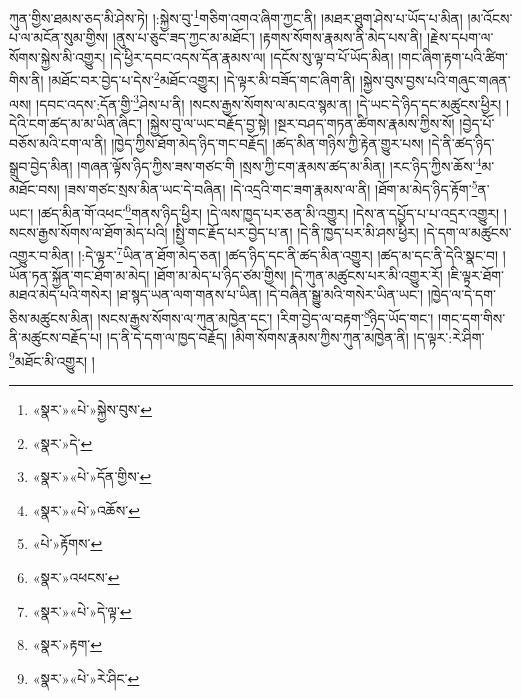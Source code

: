 ཀུན་གྱིས་ཐམས་ཅད་མི་ཤེས་ཏེ། །:སྐྱེས་བུ་\footnote{«སྣར་»«པེ་»སྐྱེས་བུས་}གཅིག་འགའ་ཞིག་ཀྱང་ནི། །མཐར་ཐུག་ཤེས་པ་ཡོད་པ་མིན། །མ་འོངས་པ་ལ་མངོན་སུམ་གྱིས། །ནུས་པ་ཅུང་ཟད་ཀྱང་མ་མཐོང་། །རྟགས་སོགས་རྣམས་ནི་མེད་པས་ནི། །རྗེས་དཔག་ལ་སོགས་སྐྱེས་མི་འགྱུར། །དེ་ཕྱིར་དབང་འདས་དོན་རྣམས་ལ། །དངོས་སུ་ལྟ་བ་པོ་ཡོད་མིན། །གང་ཞིག་རྟག་པའི་ཚིག་གིས་ནི། །མཐོང་བར་བྱེད་པ་དེས་\footnote{«སྣར་»དེ་}མཐོང་འགྱུར། །དེ་ལྟར་མི་བཟོད་གང་ཞིག་ནི། །སྐྱེས་བུས་བྱས་པའི་གཞུང་གཞན་ལས། །དབང་འདས་:དོན་གྱི་\footnote{«སྣར་»«པེ་»དོན་གྱིས་}ཤེས་པ་ནི། །སངས་རྒྱས་སོགས་ལ་མངའ་སྙམ་ན། །དེ་ཡང་དེ་ཉིད་དང་མཚུངས་ཕྱིར། །དེའི་ངག་ཚད་མ་མ་ཡིན་ཞིང་། །སྐྱེས་བུ་ལ་ཡང་བརྗོད་བྱ་སྟེ། །སྔར་བཤད་གཏན་ཚིགས་རྣམས་ཀྱིས་སོ། །བྱེད་པོ་བཅོས་མའི་ངག་ལ་ནི། །ཁྱེད་ཀྱིས་ཐོག་མེད་ཉིད་གང་བརྗོད། །ཚད་མིན་གཉིས་ཀྱི་རྟེན་གྱུར་པས། །དེ་ནི་ཚད་ཉིད་སྒྲུབ་བྱེད་མིན། །གཞན་ལྟོས་ཉིད་ཀྱིས་ཟས་གཙང་གི །སྲས་ཀྱི་ངག་རྣམས་ཚད་མ་མིན། །རང་ཉིད་ཀྱིས་ཆོས་\footnote{«སྣར་»«པེ་»འཆོས་}མ་མཐོང་བས། །ཟས་གཙང་སྲས་མིན་ཡང་དེ་བཞིན། །དེ་འདྲའི་གང་ཟག་རྣམས་ལ་ནི། །ཐོག་མ་མེད་ཉིད་རྟོག་\footnote{«པེ་»རྟོགས་}ན་ཡང་། །ཚད་མིན་གོ་འཕང་\footnote{«སྣར་»འཕངས་}གནས་ཉིད་ཕྱིར། །དེ་ལས་ཁྱད་པར་ཅན་མི་འགྱུར། །དེས་ན་དཔྱོད་པ་པ་འདྲར་འགྱུར། །སངས་རྒྱས་སོགས་ལ་ཐོག་མེད་པའི། །སྤྱི་གང་རྗོད་པར་བྱེད་པ་ན། །དེ་ནི་ཁྱད་པར་མི་ཤས་ཕྱིར། །དེ་དག་ལ་མཚུངས་འགྱུར་བ་མིན། །:དེ་ལྟར་\footnote{«སྣར་»«པེ་»དེ་ལྟ་}ཡིན་ན་ཐོག་མེད་ཅན། །ཚད་ཉིད་དང་ནི་ཚད་མིན་འགྱུར། །ཚད་མ་དང་ནི་དེའི་སྣང་བ། །ཡོན་ཏན་སྐྱོན་གང་ཐོག་མ་མེད། །ཐོག་མ་མེད་པ་ཉིད་ཙམ་གྱིས། །དེ་ཀུན་མཚུངས་པར་མི་འགྱུར་རོ། །ཇི་ལྟར་ཐོག་མཐའ་མེད་པའི་གསེར། །ཐ་སྙད་ཡན་ལག་གནས་པ་ཡིན། །དེ་བཞིན་སྒྱུ་མའི་གསེར་ཡིན་ཡང་། །ཁྱེད་ལ་དེ་དག་ཅིས་མཚུངས་མིན། །སངས་རྒྱས་སོགས་ལ་ཀུན་མཁྱེན་དང་། །རིག་བྱེད་ལ་བརྟག་\footnote{«སྣར་»རྟག་}ཉིད་ཡོད་གང་། །གང་དག་གིས་ནི་མཚུངས་བརྗོད་པ། །ད་ནི་དེ་དག་ལ་ཁྱད་བརྗོད། །མིག་སོགས་རྣམས་ཀྱིས་ཀུན་མཁྱེན་ནི། །ད་ལྟར་:རེ་ཤིག་\footnote{«སྣར་»«པེ་»རེ་ཤིང་}མཐོང་མི་འགྱུར། །

